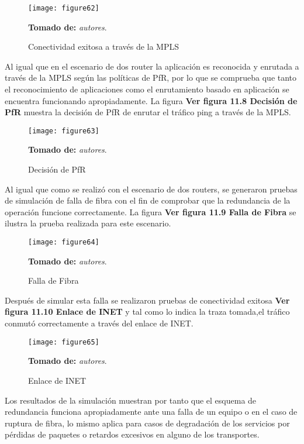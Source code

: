 \begin{figure}[htbp]
  \centering
    {\texttt{[image: figure62]}}%
  \caption{Conectividad exitosa a través de la MPLS}
  \textbf{Tomado de:} \textit{autores}.
  \label{fig:fig2subfig}
\end{figure}

Al igual que en el escenario de dos router la aplicación es reconocida y enrutada a través de la MPLS según las políticas de PfR, por lo que se comprueba que tanto el reconocimiento de aplicaciones como el enrutamiento basado en aplicación se encuentra funcionando apropiadamente. La figura \textbf{Ver figura 11.8 Decisión de PfR} muestra la decisión de PfR de enrutar el tráfico ping a través de la MPLS.

\begin{figure}[htbp]
  \centering
    {\texttt{[image: figure63]}}%
  \caption{Decisión de PfR}
  \textbf{Tomado de:} \textit{autores}.
  \label{fig:fig2subfig}
\end{figure}

Al igual que como se realizó con el escenario de dos routers, se generaron pruebas de simulación de falla de fibra con el fin de comprobar que la redundancia de la operación funcione correctamente. La figura  \textbf{Ver figura 11.9 Falla de Fibra} se ilustra la prueba realizada para este escenario.

\begin{figure}[htbp]
  \centering
    {\texttt{[image: figure64]}}%
  \caption{Falla de Fibra }
  \textbf{Tomado de:} \textit{autores}.
  \label{fig:fig2subfig}
\end{figure}

Después de simular esta falla se realizaron pruebas de conectividad exitosa \textbf{Ver figura 11.10 Enlace de INET}  y tal como lo indica la traza tomada,el tráfico conmutó correctamente a través del enlace de INET.


\begin{figure}[htbp]
  \centering
    {\texttt{[image: figure65]}}%
  \caption{Enlace de INET}
  \textbf{Tomado de:} \textit{autores}.
  \label{fig:fig2subfig}
\end{figure}

Los resultados de la simulación muestran por tanto que el esquema de redundancia funciona apropiadamente ante una falla de un equipo o en el caso de ruptura de fibra, lo mismo aplica para casos de degradación de los servicios por pérdidas de paquetes o retardos excesivos en alguno de los transportes.